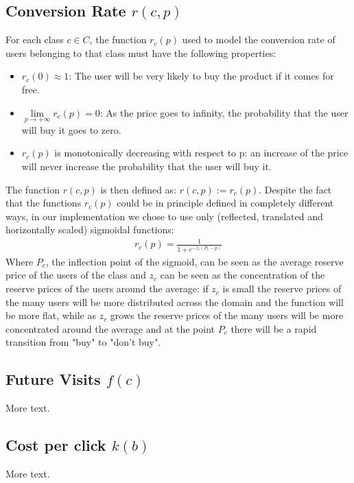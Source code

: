 \documentclass[11pt]{article} %
\begin{document}
\subsection{Conversion Rate $r(c,p)$}
For each class $c \in C$, the function $r_c(p)$ used to model the conversion rate of users belonging to that class must have the following properties:
\begin{itemize}
\item $r_c(0) \approx 1$: The user will be very likely to buy the product if it comes for free.
\item $\lim\limits_{p \to +\infty} r_c(p) = 0$: As the price goes to infinity, the probability that the user will buy it goes to zero.
\item $r_c(p)$ is monotonically decreasing with respect to p: an increase of the price will never increase the probability that the user will buy it.
\end{itemize}
The function $r(c,p)$ is then defined as: $r(c,p) := r_c(p)$.
Despite the fact that the functions $r_c(p)$ could be in principle defined in completely different ways, in our implementation we chose to use only (reflected, translated and horizontally scaled) sigmoidal functions:
\begin{align*}
r_c(p) = \frac{1}{1+e^{-z_c(P_c-p)}}
\end{align*}
Where $P_c$, the inflection point of the sigmoid, can be seen as the average reserve price of the users of the class and $z_c$ can be seen as the concentration of the reserve prices of the users around the average: if $z_c$ is small the reserve prices of the many users will be more distributed across the domain and the function will be more flat, while as $z_c$ grows the reserve prices of the many users will be more concentrated around the average and at the point $P_c$ there will be a rapid transition from "buy" to "don't buy".
\subsection{Future Visits $f(c)$}

More text.

\subsection{Cost per click $k(b)$}

More text.
\end{document}
